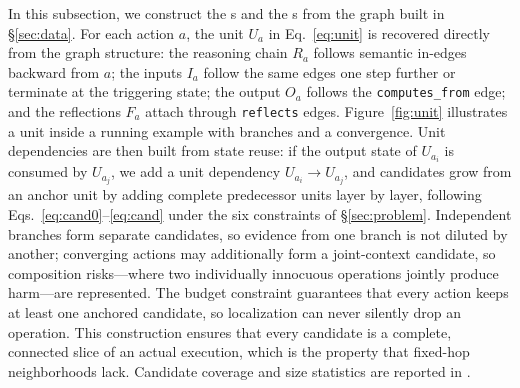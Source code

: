 In this subsection, we construct the \aeu{}s and the \csg{}s from the graph built in \S\ref{sec:data}. For each action $a$, the unit $U_a$ in Eq.~\eqref{eq:unit} is recovered directly from the graph structure: the reasoning chain $R_a$ follows semantic in-edges backward from $a$; the inputs $I_a$ follow the same edges one step further or terminate at the triggering state; the output $O_a$ follows the \texttt{computes\_from} edge; and the reflections $F_a$ attach through \texttt{reflects} edges. Figure~\ref{fig:unit} illustrates a unit inside a running example with branches and a convergence. Unit dependencies are then built from state reuse: if the output state of $U_{a_i}$ is consumed by $U_{a_j}$, we add a unit dependency $U_{a_i}\rightarrow U_{a_j}$, and candidates grow from an anchor unit by adding complete predecessor units layer by layer, following Eqs.~\eqref{eq:cand0}--\eqref{eq:cand} under the six constraints of \S\ref{sec:problem}. Independent branches form separate candidates, so evidence from one branch is not diluted by another; converging actions may additionally form a joint-context candidate, so composition risks---where two individually innocuous operations jointly produce harm---are represented. The budget constraint guarantees that every action keeps at least one anchored candidate, so localization can never silently drop an operation. This construction ensures that every candidate is a complete, connected slice of an actual execution, which is the property that fixed-hop neighborhoods lack. Candidate coverage and size statistics are reported in .

